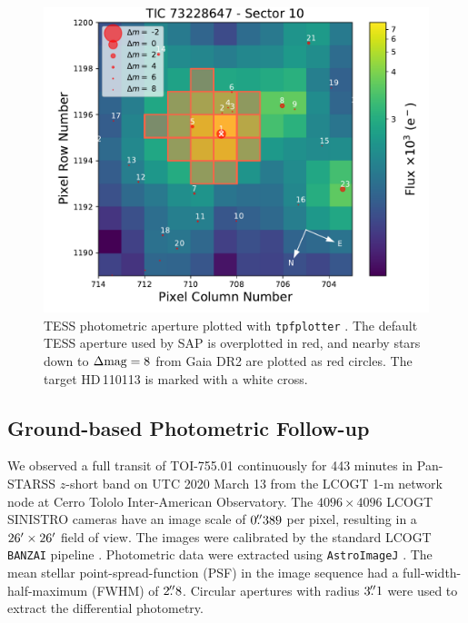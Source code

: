 \documentclass[fleqn,usenatbib]{mnras}
\newcommand{\Tstar}{HD\,110113}
\begin{document}
\begin{figure}
    \centering
    \includegraphics[width=\columnwidth, trim={0 0.8cm 1.8cm 0.1cm}]{TPF_Gaia_TIC73228647_S10}
    \caption{TESS photometric aperture plotted with \texttt{tpfplotter} \citep{2020A&A...635A.128A}. The default TESS aperture used by SAP is overplotted in red, and nearby stars down to $\Delta{\rm mag}=8$ from Gaia DR2 \citep{brown2018gaia} are plotted as red circles. The target \Tstar{} is marked with a white cross.}
    \label{fig:tpf}
\end{figure}

\subsection{Ground-based Photometric Follow-up}
We observed a full transit of TOI-755.01 continuously for 443 minutes in Pan-STARSS $z$-short band on UTC 2020 March 13 from the LCOGT \citep{Brown:2013} 1-m network node at Cerro Tololo Inter-American Observatory.
The $4096\times4096$ LCOGT SINISTRO cameras have an image scale of $0\hbox{$.\!\!^{\prime\prime}$}389$ per pixel, resulting in a $26\hbox{$^\prime$}\times26\hbox{$^\prime$}$ field of view.
The images were calibrated by the standard LCOGT {\tt BANZAI} pipeline \citep{McCully:2018}.
Photometric data were extracted using {\tt AstroImageJ} \citep{Collins:2017}.
The mean stellar point-spread-function (PSF) in the image sequence had a full-width-half-maximum (FWHM) of $2\hbox{$.\!\!^{\prime\prime}$}8$.
Circular apertures with radius $3\hbox{$.\!\!^{\prime\prime}$}1$ were used to extract the differential photometry.
\end{document}
